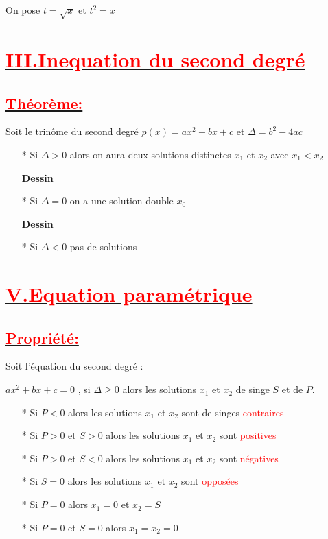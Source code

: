 \documentclass[12pt]{article}
\begin{document}
On pose $t=\sqrt{x}$ et $t^{2}=x$
\section*{\underline{\textbf{\textcolor{red}{III.Inequation du second degré}}}}
\subsection*{\underline{\textbf{\textcolor{red}{Théorème:}}}}
Soit le trinôme du second degré $p(x)=ax^{2}+bx+c$ et $\Delta=b^{2}-4ac$
\begin{itemize}
\item[*] Si $\Delta >0$ alors on aura deux solutions distinctes $x_{1}$ et $x_{2}$ avec $x_{1} < x_{2}$

\textbf{Dessin}

\item[*] Si $\Delta =0$ on a une solution double $x_{0}$

\textbf{Dessin}

\item[*] Si $\Delta <0$ pas de solutions
\end{itemize}
\section*{\underline{\textbf{\textcolor{red}{V.Equation paramétrique}}}}
\subsection*{\underline{\textbf{\textcolor{red}{Propriété:}}}}
Soit l'équation du second degré : 

$ax^{2}+bx+c=0$ , si $\Delta \geq 0$ alors les solutions $x_{1}$ et $x_{2}$ de singe $S$ et de $P$.
\begin{itemize}
\item[*] Si $P < 0$ alors les solutions $x_{1}$ et $x_{2}$ sont de singes \textcolor{red}{contraires}
\item[*] Si $P>0$ et $S>0$ alors les solutions $x_{1}$ et $x_{2}$ sont  \textcolor{red}{positives}
\item[*] Si $P>0$ et $S<0$ alors les solutions $x_{1}$ et $x_{2}$ sont  \textcolor{red}{négatives}
\item[*] Si $S=0$ alors les solutions $x_{1}$ et $x_{2}$ sont  \textcolor{red}{opposées}
\item[*] Si $P=0$  alors $x_{1}=0$ et $x_{2}=S$
\item[*] Si $P=0$ et $S=0$ alors  $x_{1}=x_{2}=0$
\end{itemize}
\end{document}
